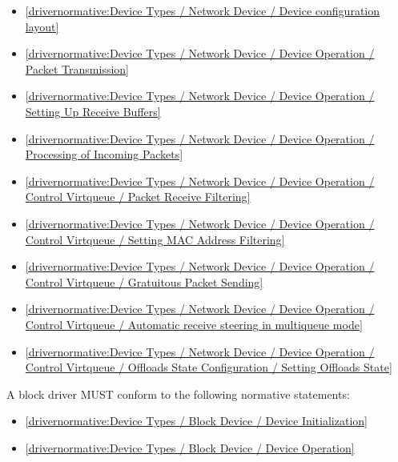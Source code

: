 \begin{itemize}
\item \ref{drivernormative:Device Types / Network Device / Device configuration layout}
\item \ref{drivernormative:Device Types / Network Device / Device Operation / Packet Transmission}
\item \ref{drivernormative:Device Types / Network Device / Device Operation / Setting Up Receive Buffers}
\item \ref{drivernormative:Device Types / Network Device / Device Operation / Processing of Incoming Packets}
\item \ref{drivernormative:Device Types / Network Device / Device Operation / Control Virtqueue / Packet Receive Filtering}
\item \ref{drivernormative:Device Types / Network Device / Device Operation / Control Virtqueue / Setting MAC Address Filtering}
\item \ref{drivernormative:Device Types / Network Device / Device Operation / Control Virtqueue / Gratuitous Packet Sending}
\item \ref{drivernormative:Device Types / Network Device / Device Operation / Control Virtqueue / Automatic receive steering in multiqueue mode}
\item \ref{drivernormative:Device Types / Network Device / Device Operation / Control Virtqueue / Offloads State Configuration / Setting Offloads State}
\end{itemize}

\label{sec:Conformance / Driver Conformance / Block Driver Conformance}

A block driver MUST conform to the following normative statements:

\begin{itemize}
\item \ref{drivernormative:Device Types / Block Device / Device Initialization}
\item \ref{drivernormative:Device Types / Block Device / Device Operation}
\end{itemize}

\label{sec:Conformance / Driver Conformance / Console Driver Conformance}

